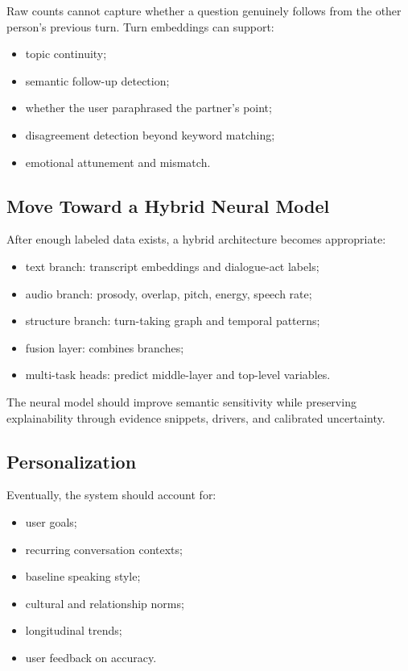 \documentclass[11pt]{article}
\begin{document}
Raw counts cannot capture whether a question genuinely follows from the other person's previous turn. Turn embeddings can support:

\begin{itemize}[leftmargin=*]
  \item topic continuity;
  \item semantic follow-up detection;
  \item whether the user paraphrased the partner's point;
  \item disagreement detection beyond keyword matching;
  \item emotional attunement and mismatch.
\end{itemize}

\subsection{Move Toward a Hybrid Neural Model}

After enough labeled data exists, a hybrid architecture becomes appropriate:

\begin{itemize}[leftmargin=*]
  \item text branch: transcript embeddings and dialogue-act labels;
  \item audio branch: prosody, overlap, pitch, energy, speech rate;
  \item structure branch: turn-taking graph and temporal patterns;
  \item fusion layer: combines branches;
  \item multi-task heads: predict middle-layer and top-level variables.
\end{itemize}

The neural model should improve semantic sensitivity while preserving explainability through evidence snippets, drivers, and calibrated uncertainty.

\subsection{Personalization}

Eventually, the system should account for:

\begin{itemize}[leftmargin=*]
  \item user goals;
  \item recurring conversation contexts;
  \item baseline speaking style;
  \item cultural and relationship norms;
  \item longitudinal trends;
  \item user feedback on accuracy.
\end{itemize}
\end{document}
